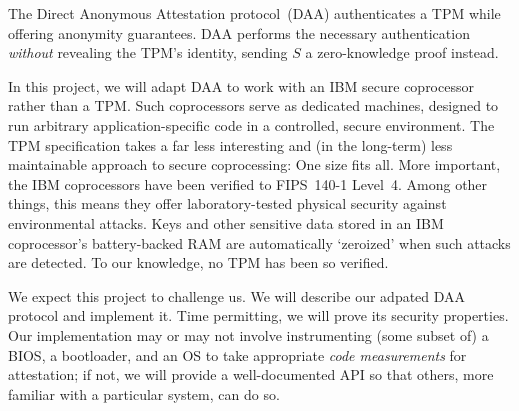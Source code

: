 The Direct Anonymous Attestation protocol~(DAA) authenticates a TPM
while offering anonymity guarantees.
DAA performs the necessary authentication \emph{without} revealing the TPM's identity,
sending $S$ a zero-knowledge proof instead.

In this project, we will adapt DAA to work with an IBM secure coprocessor
rather than a TPM.
Such coprocessors serve as dedicated machines, 
designed to run arbitrary application-specific
code in a controlled, secure environment.
The TPM specification takes a far less
interesting and (in the long-term) less maintainable approach to
secure coprocessing: One size fits all.
More important, the IBM coprocessors have been verified to FIPS~140-1 Level~4.
Among other things, this means they offer laboratory-tested physical security against
environmental attacks.
Keys and other sensitive data stored in an IBM coprocessor's battery-backed RAM
are automatically `zeroized' when such attacks are detected.
To our knowledge, no TPM has been so verified.

We expect this project to challenge us.
We will describe our adpated DAA protocol and implement it.
Time permitting, we will prove its security properties.
Our implementation may or may not involve instrumenting (some subset of)
a BIOS, a bootloader, and an OS to take appropriate \emph{code measurements} for attestation;
if not, we will provide a well-documented API so that others,
more familiar with a particular system, can do so.

\begin{comment}
	\emph{PDS and EE:}
	These are the contributions we hoped for a few days ago.

	They should be the points covered by our draft---not the story though.
	\begin{itemize}
	\item What can a cryptocard, compared to TPM, add to the picture?
	\item Why DAA is useful?
	\item There is no out-of-the-box DAA implementation for cryptocards.
	\item Cryptocard-specific DAA eases the implementation since we don't have
to offload any computations to the host.
	\item We have a *working* implementation in ML
	\item We have a *working* implementation in C for the cryptocard
	\end{itemize}
\end{comment}
